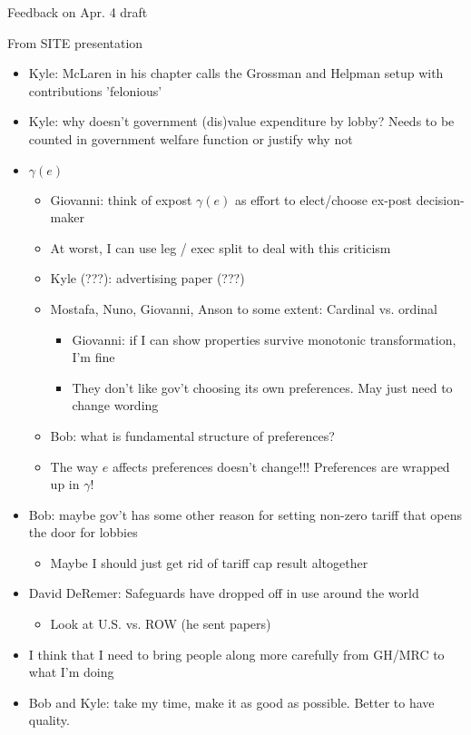 \documentclass[12pt]{article}
\newcommand{\ga}{\gamma}
\begin{document}
\begin{center}
Feedback on Apr. 4 draft
\end{center}

From SITE presentation
\begin{itemize}
	\item Kyle: McLaren in his chapter calls the Grossman and Helpman setup with contributions 'felonious'
	\item Kyle: why doesn't government (dis)value expenditure by lobby? Needs to be counted in government welfare function or justify why not
	\item $\ga(e)$
		\begin{itemize}
			\item Giovanni: think of expost $\ga(e)$ as effort to elect/choose ex-post decision-maker
			\item At worst, I can use leg / exec split to deal with this criticism
			\item Kyle (???): advertising paper (???)
			\item Mostafa, Nuno, Giovanni, Anson to some extent: Cardinal vs. ordinal
				\begin{itemize}
					\item Giovanni: if I can show properties survive  monotonic transformation, I'm fine
					\item They don't like gov't choosing its own preferences. May just need to change wording
				\end{itemize}
			\item Bob: what is fundamental structure of preferences?
			\item The way $e$ affects preferences doesn't change!!! Preferences are wrapped up in $\ga$!
		\end{itemize}
	\item Bob: maybe gov't has some other reason for setting non-zero tariff that opens the door for lobbies
		\begin{itemize}
			\item Maybe I should just get rid of tariff cap result altogether
		\end{itemize}
	\item David DeRemer: Safeguards have dropped off in use around the world
		\begin{itemize}
			\item Look at U.S. vs. ROW (he sent papers)
		\end{itemize}
	\item I think that I need to bring people along more carefully from GH/MRC to what I'm doing
	\item Bob and Kyle: take my time, make it as good as possible. Better to have quality.
\end{itemize}
\end{document}
